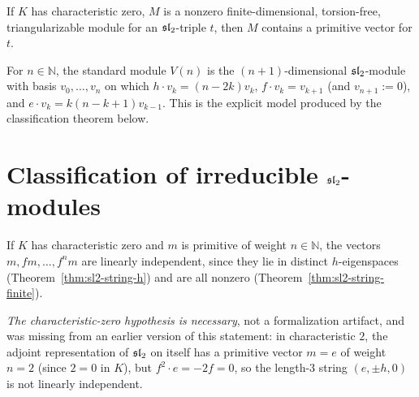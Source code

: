 \begin{theorem}
  \label{thm:sl2-primitive-exists}
  \mathlibok
  If $K$ has characteristic zero, $M$ is a nonzero finite-dimensional,
  torsion-free, triangularizable module for an $\mathfrak{sl}_2$-triple $t$, then $M$
  contains a primitive vector for $t$.
\end{theorem}

\begin{definition}
  \label{def:sl2-standard-module}
  \leanok
  For $n \in \mathbb{N}$, the standard module $V(n)$ is the
  $(n+1)$-dimensional $\mathfrak{sl}_2$-module with basis $v_0, \dots, v_n$ on which
  $h \cdot v_k = (n-2k) v_k$, $f \cdot v_k = v_{k+1}$ (and $v_{n+1} := 0$), and
  $e \cdot v_k = k(n-k+1) v_{k-1}$. This is the explicit model produced by
  the classification theorem below.
\end{definition}

\section{Classification of irreducible $\mathfrak{sl}_2$-modules}
\label{sec:sl2-classification}

\begin{theorem}
  \label{thm:sl2-string-independent}
  \leanok
  If $K$ has characteristic zero and $m$ is primitive of weight
  $n \in \mathbb{N}$, the vectors $m, fm, \dots, f^n m$ are linearly
  independent, since they lie in distinct $h$-eigenspaces
  (Theorem~\ref{thm:sl2-string-h}) and are all nonzero
  (Theorem~\ref{thm:sl2-string-finite}).

  \emph{The characteristic-zero hypothesis is necessary}, not a formalization
  artifact, and was missing from an earlier version of this statement: in
  characteristic $2$, the adjoint representation of $\mathfrak{sl}_2$ on itself has a
  primitive vector $m = e$ of weight $n = 2$ (since $2 = 0$ in $K$), but
  $f^2 \cdot e = -2f = 0$, so the length-$3$ string $(e, \pm h, 0)$ is not
  linearly independent.
\end{theorem}

